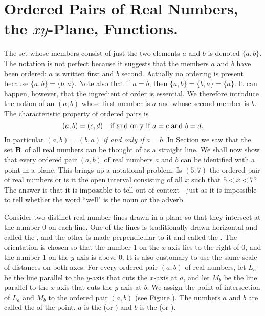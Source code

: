 \section{Ordered Pairs of Real Numbers, the $xy$-Plane, Functions.}
\label{sec 1.2} 

The set whose members consist of just the two elements $a$ and $b$
is denoted $\{ a, b \}$.
The notation is not perfect
because it suggests that the members $a$ and $b$ have been ordered:
$a$ is written first and $b$ second.
Actually no ordering is present because $\{ a, b \} = \{ b, a \}$.
Note also that if $a = b$,
then $\{ a, b \} = \{ b, a \} = \{ a \}$.
It can happen, however, that the ingredient of order is essential.
We therefore introduce the notion of
an  $(a, b)$
whose first member is $a$ and whose second member  is $b$.
The characteristic property of ordered pairs is
\[
(a, b) = (c, d)
\quad \mbox{if and only if  $a = c$ and $b=d$.}
\]
In particular $(a, b) = (b, a)$ \emph{if and only if} $a = b$.
In Section 
we saw that the set $\mathrm{\bf R}$ of all real numbers
can be thought of as a straight line.
We shall now show that every ordered pair $(a, b)$
of real numbers $a$ and $b$
can be identified with a point in a plane.
This brings up a notational problem:
Is $(5, 7)$ the ordered pair of real numbers
or is it the open interval consisting of all $x$
such that $5 < x < 7$?
The answer is that it is impossible to tell
out of context---just as it is impossible to tell whether the word
``well" is the noun or the adverb.

Consider two distinct real number lines drawn in a plane
so that they intersect at the number $0$ on each line.
One of the lines is traditionally drawn horizontal
and called the ,
and the other is made perpendicular to it
and called the .
The orientation is chosen so that the number $1$ on the $x$-axis
lies to the right of $0$,
and the number $1$ on the $y$-axis is above $0$.
It is also customary to use the same scale of distances on both axes.
For every ordered pair $(a, b)$ of real numbers,
let $L_a$ be the line parallel to the $y$-axis
that cuts the $x$-axis at $a$,
and let $M_b$ be the line parallel to the $x$-axis
that cuts the $y$-axis at $b$.
We assign the point of intersection of $L_a$ and $M_b$
to the ordered pair $(a, b)$ (see Figure ).
The numbers $a$ and $b$ are called the  of the point.
$a$ is the 
(or )
and $b$ is the 
(or ).


